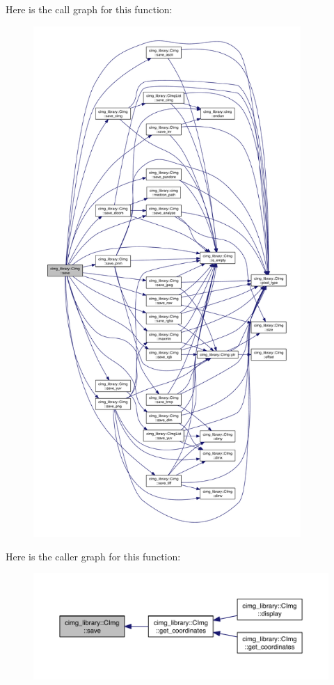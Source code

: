 Here is the call graph for this function\-:
\nopagebreak
\begin{figure}[H]
\begin{center}
\leavevmode
\includegraphics[height=550pt]{structcimg__library_1_1_c_img_a593d3d4f5eae665e93c3f551b2da3f03_cgraph}
\end{center}
\end{figure}




Here is the caller graph for this function\-:
\nopagebreak
\begin{figure}[H]
\begin{center}
\leavevmode
\includegraphics[width=350pt]{structcimg__library_1_1_c_img_a593d3d4f5eae665e93c3f551b2da3f03_icgraph}
\end{center}
\end{figure}


